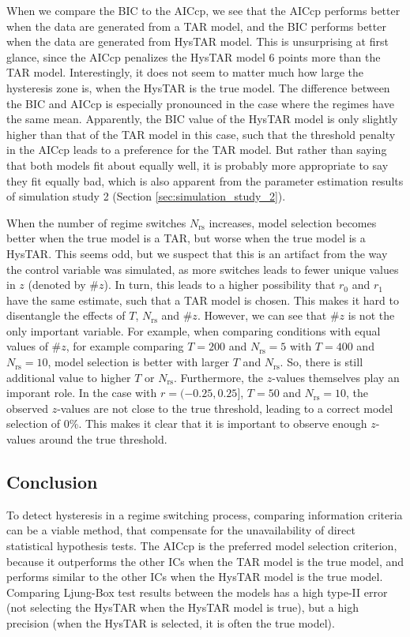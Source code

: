 \documentclass{article}
\begin{document}
When we compare the BIC to the AICcp, we see that the AICcp performs better when the data are generated from a TAR model, and the BIC performs better when the data are generated from HysTAR model. This is unsurprising at first glance, since the AICcp penalizes the HysTAR model 6 points more than the TAR model. Interestingly, it does not seem to matter much how large the hysteresis zone is, when the HysTAR is the true model.
	The difference between the BIC and AICcp is especially pronounced in the case where the regimes have the same mean. Apparently, the BIC value of the HysTAR model is only slightly higher than that of the TAR model in this case, such that the threshold penalty in the AICcp leads to a preference for the TAR model. But rather than saying that both models fit about equally well, it is probably more appropriate to say they fit equally bad, which is also apparent from the parameter estimation results of simulation study 2 (Section \ref{sec:simulation_study_2}).

When the number of regime switches $N_{\mathrm{rs}}$ increases, model selection becomes better when the true model is a TAR, but worse when the true model is a HysTAR. 
This seems odd, but we suspect that this is an artifact from the way the control variable was simulated, as more switches leads to fewer unique values in $z$ (denoted by \#$z$). In turn, this leads to a higher possibility that $r_0$ and $r_1$ have the same estimate, such that a TAR model is chosen.
This makes it hard to disentangle the effects of $T$, $N_{\mathrm{rs}}$ and \#$z$.
However, we can see that \#$z$ is not the only important variable.
For example, when comparing conditions with equal values of \#$z$, for example comparing $T = 200$ and $N_{\mathrm{rs}} = 5$ with $T = 400$ and $N_{\mathrm{rs}} = 10$, model selection is better with larger $T$ and $N_{\mathrm{rs}}$.
So, there is still additional value to higher $T$ or $N_{\mathrm{rs}}$.
Furthermore, the $z$-values themselves play an imporant role. 
In the case with $r = (-0.25, 0.25]$, $T = 50$ and $N_{\mathrm{rs}} = 10$, the observed $z$-values are not close to the true threshold, leading to a correct model selection of 0\%.
This makes it clear that it is important to observe enough $z$-values around the true threshold.

\subsection{Conclusion}
To detect hysteresis in a regime switching process, comparing information criteria can be a viable method, that compensate for the unavailability of direct statistical hypothesis tests. 
The AICcp is the preferred model selection criterion, because it outperforms the other ICs when the TAR model is the true model, and performs similar to the other ICs when the HysTAR model is the true model.
Comparing Ljung-Box test results between the models has a high type-II error (not selecting the HysTAR when the HysTAR model is true), but a high precision (when the HysTAR is selected, it is often the true model).
\end{document}
